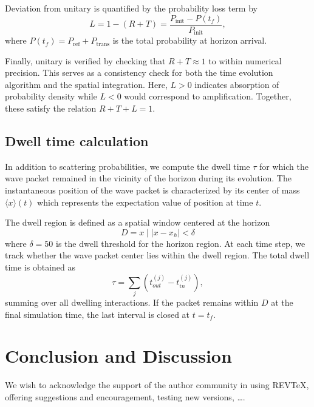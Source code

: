 \documentclass[%
 aip,
 amsmath,amssymb,
 reprint,%
]{revtex4-1}
\begin{document}
Deviation from unitary is quantified by the probability loss term by
\begin{equation}
    L=1-(R+T)=\frac{P_{\text{init}} - P(t_f)}{P_{\text{init}}},
\end{equation}
where $P(t_f)=P_{\text{ref}} + P_{\text{trans}}$ is the total probability at horizon arrival. 

Finally, unitary is verified by checking that $R + T \approx 1$ to within numerical precision. This serves as a consistency check for both the time evolution algorithm and the spatial integration. Here, $L>0$ indicates absorption of probability density while $L<0$ would correspond to amplification. Together, these satisfy the relation $R+T+L=1$.

\subsection{Dwell time calculation}

In addition to scattering probabilities, we compute the dwell time $\tau$ for which the wave packet remained in the vicinity of the horizon during its evolution. The instantaneous position of the wave packet is characterized by its center of mass $\langle x \rangle (t)$ which represents the expectation value of position at time $t$.

The dwell region is defined as a spatial window centered at the horizon
\begin{equation}
    D={x \mid|x-x_h|<\delta}
\end{equation}
where $\delta=50$ is the dwell threshold for the horizon region. At each time step, we track whether the wave packet center lies within the dwell region. The total dwell time is obtained as
\begin{equation}
    \tau=\sum_j\left(t_{out}^{(j)} - t_{in}^{(j)} \right),
\end{equation}
summing over all dwelling interactions. If the packet remains within $D$ at the final simulation time, the last interval is closed at $t=t_f$.

\section{Conclusion and Discussion}



\begin{acknowledgments}
We wish to acknowledge the support of the author community in using
REV\TeX{}, offering suggestions and encouragement, testing new versions,
\dots.
\end{acknowledgments}
\end{document}
